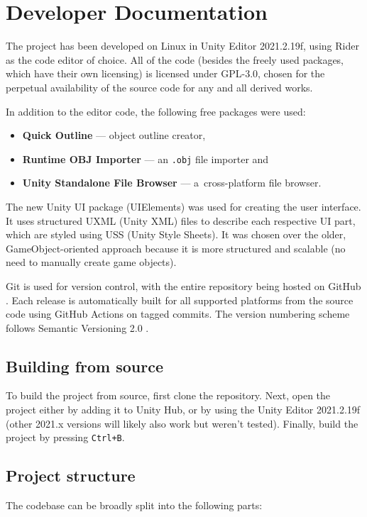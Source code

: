 \section{Developer Documentation}\label{sec:progdoc}

The project has been developed on Linux in Unity Editor 2021.2.19f, using Rider as the code editor of choice.
All of the code (besides the freely used packages, which have their own licensing) is licensed under GPL-3.0, chosen for the perpetual availability of the source code for any and all derived works.

In addition to the editor code, the following free packages were used:

\begin{itemize}
	\item \textbf{Quick Outline} \cite{quickoutline} --- object outline creator,
	\item \textbf{Runtime OBJ Importer} \cite{objimport} --- an \verb|.obj| file importer and
	\item \textbf{Unity Standalone File Browser} \cite{unitystandalonefilebrowser} --- a~cross-platform file browser.
\end{itemize}

The new Unity UI package (UIElements) was used for creating the user interface.
It uses structured UXML (Unity XML) files to describe each respective UI part, which are styled using USS (Unity Style Sheets).
It was chosen over the older, GameObject-oriented approach because it is more structured and scalable (no need to manually create game objects).

Git is used for version control, with the entire repository being hosted on GitHub \cite{cled}.
Each release is automatically built for all supported platforms from the source code using GitHub Actions on tagged commits.
The version numbering scheme follows Semantic Versioning 2.0 \cite{semver}.

\subsection{Building from source}
To build the project from source, first clone the repository.
Next, open the project either by adding it to Unity Hub, or by using the Unity Editor 2021.2.19f (other 2021.x versions will likely also work but weren't tested).
Finally, build the project by pressing \verb|Ctrl+B|.

\subsection{Project structure}
The codebase can be broadly split into the following parts:

